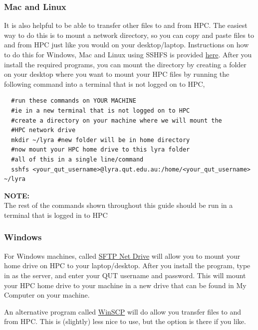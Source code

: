 \subsubsection{Mac and Linux}
It is also helpful to be able to transfer other files to and from HPC. The easiest way to do this is to mount a network directory, so you can copy and paste files to and from HPC just like you would on your desktop/laptop. Instructions on how to do this for Windows, Mac and Linux using SSHFS is provided \href{https://www.digitalocean.com/community/tutorials/how-to-use-sshfs-to-mount-remote-file-systems-over-ssh}{here}. After you install the required programs, you can mount the directory by creating a folder on your desktop where you want to mount your HPC files by running the following command into a terminal that is not logged on to HPC,
%
%
\\
\par
\begin{verbatim}
  #run these commands on YOUR MACHINE
  #ie in a new terminal that is not logged on to HPC
  #create a directory on your machine where we will mount the
  #HPC network drive
  mkdir ~/lyra #new folder will be in home directory
  #now mount your HPC home drive to this lyra folder
  #all of this in a single line/command
  sshfs <your_qut_username>@lyra.qut.edu.au:/home/<your_qut_username> ~/lyra
\end{verbatim}
% 
%
%
\par
\begin{story}
  \textbf{NOTE:}
  \\
  The rest of the commands shown throughout this guide should be run in a terminal that is logged in to HPC
\end{story}
% 
%
\subsubsection{Windows}
For Windows machines, called \href{https://www.nsoftware.com/netdrive/sftp/}{SFTP Net Drive} will allow you to mount your home drive on HPC to your laptop/desktop. After you install the program, type in  as the server, and enter your QUT username and password. This will mount your HPC home drive to your machine in a new drive that can be found in My Computer on your machine.
%
\par
%
An alternative program called \href{https://winscp.net/eng/download.php}{WinSCP} will do allow you transfer files to and from HPC. This is (slightly) less nice to use, but the option is there if you like.
%
%
